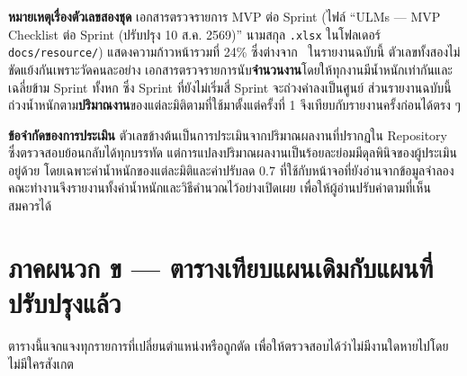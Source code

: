 \vspace{1em}
\noindent\textbf{หมายเหตุเรื่องตัวเลขสองชุด} เอกสารตรวจรายการ MVP ต่อ Sprint (ไฟล์ ``ULMs — MVP Checklist ต่อ Sprint (ปรับปรุง 10 ส.ค. 2569)'' นามสกุล \texttt{.xlsx} ในโฟลเดอร์ \texttt{docs/resource/}) แสดงความก้าวหน้ารวมที่ 24\% ซึ่งต่างจาก \actualpct\ ในรายงานฉบับนี้ ตัวเลขทั้งสองไม่ขัดแย้งกันเพราะวัดคนละอย่าง เอกสารตรวจรายการนับ\textbf{จำนวนงาน}โดยให้ทุกงานมีน้ำหนักเท่ากันและเฉลี่ยข้าม Sprint ทั้งหก ซึ่ง Sprint ที่ยังไม่เริ่มสี่ Sprint จะถ่วงค่าลงเป็นศูนย์ ส่วนรายงานฉบับนี้ถ่วงน้ำหนักตาม\textbf{ปริมาณงาน}ของแต่ละมิติตามที่ใช้มาตั้งแต่ครั้งที่ 1 จึงเทียบกับรายงานครั้งก่อนได้ตรง ๆ

\vspace{0.5em}
\noindent\textbf{ข้อจำกัดของการประเมิน} ตัวเลขข้างต้นเป็นการประเมินจากปริมาณผลงานที่ปรากฏใน Repository ซึ่งตรวจสอบย้อนกลับได้ทุกบรรทัด แต่การแปลงปริมาณผลงานเป็นร้อยละย่อมมีดุลพินิจของผู้ประเมินอยู่ด้วย โดยเฉพาะค่าน้ำหนักของแต่ละมิติและค่าปรับลด 0.7 ที่ใช้กับหน้าจอที่ยังอ่านจากข้อมูลจำลอง คณะทำงานจึงรายงานทั้งค่าน้ำหนักและวิธีคำนวณไว้อย่างเปิดเผย เพื่อให้ผู้อ่านปรับค่าตามที่เห็นสมควรได้

\clearpage
\section*{ภาคผนวก ข — ตารางเทียบแผนเดิมกับแผนที่ปรับปรุงแล้ว}

ตารางนี้แจกแจงทุกรายการที่เปลี่ยนตำแหน่งหรือถูกตัด เพื่อให้ตรวจสอบได้ว่าไม่มีงานใดหายไปโดยไม่มีใครสังเกต

